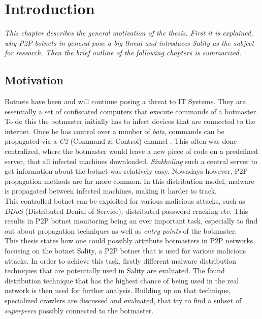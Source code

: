 \documentclass{article}
\begin{document}
\section{Introduction}
\emph{This chapter describes the general motivation of the thesis. First it is explained, why P2P botnets in general pose a big threat and introduces Sality as the subject for research. Then the brief outline of the following chapters is summarized.}

\subsection{Motivation}
Botnets have been and will continue posing a threat to IT Systems. They are essentially a set of confiscated computers that execute commands of a botmaster. To do this the botmaster initially has to infect devices that are connected to the internet. Once he has control over a number of \emph{bots}, commands can be propagated via a \emph{C2} (Command \& Control) channel \cite{abu2006multifaceted}. This often was done centralized, where the botmaster would leave a new piece of code on a predefined server, that all infected machines downloaded. \emph{Sinkholing} such a central server to get information about the botnet was relatively easy. Nowadays however, P2P propagation methods are far more common. In this distribution model, malware is propagated between infected machines, making it harder to track. \\

This controlled botnet can be exploited for various malicious attacks, such as \emph{DDoS} (Distributed Denial of Service), distributed password cracking etc. This results in P2P botnet monitoring being an ever important task, especially to find out about propagation techniques as well as \emph{entry points} of the botmaster. \\

This thesis states how one could possibly attribute botmasters in P2P networks, focusing on the botnet Sality, a P2P botnet that is used for various malicious attacks. In order to achieve this task, firstly different malware distribution techniques that are potentially used in Sality are evaluated. The found distribution technique that has the highest chance of being used in the real network is then used for further analysis. Building up on that technique, specialized crawlers are discussed and evaluated, that try to find a subset of \emph{superpeers} possibly connected to the botmaster. \\
\end{document}
